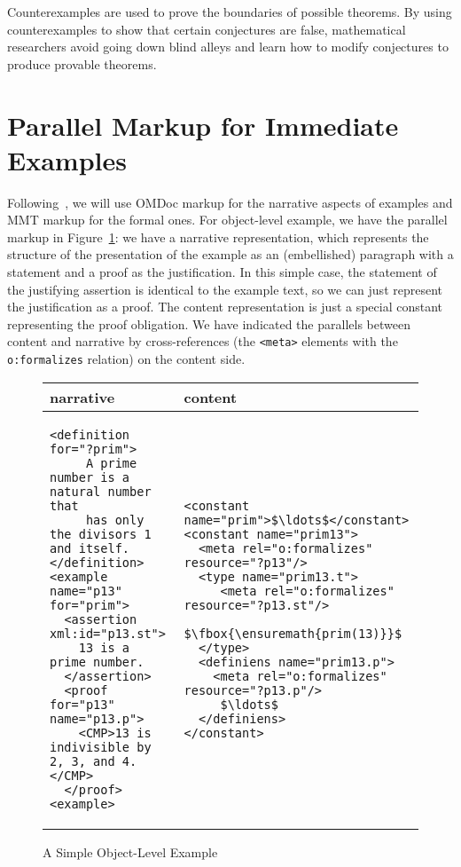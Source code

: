 \documentclass[11pt]{bluenote}
\def\mmt{MMT\xspace}
\def\omdoc{OMDoc\xspace}
\def\om#1{\fbox{\ensuremath{#1}}}
\def\omdoc{OMDoc\xspace}
\begin{document}
Counterexamples are used to prove the boundaries of possible theorems. By using
counterexamples to show that certain conjectures are false, mathematical researchers avoid
going down blind alleys and learn how to modify conjectures to produce provable
theorems. 

\section{Parallel Markup for Immediate Examples}\label{sec:immediate}

Following~\cite{KohIan:hlpmo13}, we will use \omdoc markup for the narrative aspects of
examples and \mmt markup for the formal ones. For object-level example, we have the
parallel markup in Figure~\ref{fig:simple-object}: we have a narrative representation,
which represents the structure of the presentation of the example as an (embellished)
paragraph with a statement and a proof as the justification. In this simple case, the
statement of the justifying assertion is identical to the example text, so we can just
represent the justification as a proof. The content representation is just a special
constant representing the proof obligation. We have indicated the parallels between
content and narrative by cross-references (the \lstinline|<meta>| elements with the
\lstinline|o:formalizes| relation) on the content side.

\begin{figure}[ht]\centering
\lstset{mathescape}
\begin{tabular}{|p{7.1cm}|p{7.5cm}|}\hline
  narrative & content\\\hline
\begin{lstlisting}
<definition for="?prim">
     A prime number is a natural number that 
     has only the divisors 1 and itself.
</definition>
<example name="p13" for="prim">
  <assertion xml:id="p13.st">
    13 is a prime number.
  </assertion>
  <proof for="p13" name="p13.p">
    <CMP>13 is indivisible by 2, 3, and 4.</CMP>
  </proof>
<example>
\end{lstlisting}
&
\begin{lstlisting}
<constant name="prim">$\ldots$</constant>
<constant name="prim13">
  <meta rel="o:formalizes" resource="?p13"/>
  <type name="prim13.t">
     <meta rel="o:formalizes" resource="?p13.st"/>
     $\om{prim(13)}$
  </type>
  <definiens name="prim13.p">
    <meta rel="o:formalizes" resource="?p13.p"/>
     $\ldots$
  </definiens>
</constant>
\end{lstlisting}\\\hline
\end{tabular}
\caption{A Simple Object-Level Example}\label{fig:simple-object}
\end{figure}
\end{document}
